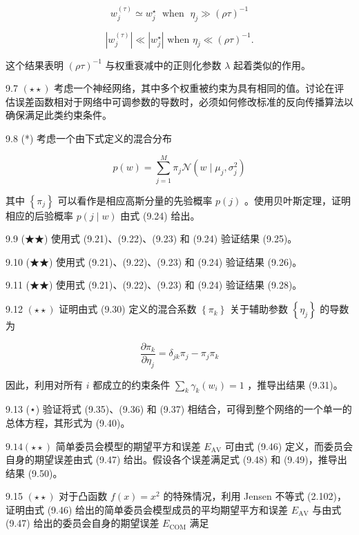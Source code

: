 \documentclass[10pt]{article}
\begin{document}
\[
{w}_{j}^{\left( \tau \right) } \simeq  {w}_{j}^{ \star  }\;\text{ when }\;{\eta }_{j} \gg  {\left( \rho \tau \right) }^{-1} \tag{9.60}
\]

\[
\left| {w}_{j}^{\left( \tau \right) }\right|  \ll  \left| {w}_{j}^{ \star  }\right| \text{ when }{\eta }_{j} \ll  {\left( \rho \tau \right) }^{-1}. \tag{9.61}
\]

这个结果表明 \({\left( \rho \tau \right) }^{-1}\) 与权重衰减中的正则化参数 \(\lambda\) 起着类似的作用。

9.7 \(\left( {\star  \star  }\right)\) 考虑一个神经网络，其中多个权重被约束为具有相同的值。讨论在评估误差函数相对于网络中可调参数的导数时，必须如何修改标准的反向传播算法以确保满足此类约束条件。

9.8 (*) 考虑一个由下式定义的混合分布

\[
p\left( w\right)  = \mathop{\sum }\limits_{{j = 1}}^{M}{\pi }_{j}\mathcal{N}\left( {w \mid  {\mu }_{j},{\sigma }_{j}^{2}}\right)  \tag{9.62}
\]

其中 \(\left\{  {\pi }_{j}\right\}\) 可以看作是相应高斯分量的先验概率 \(p\left( j\right)\) 。使用贝叶斯定理，证明相应的后验概率 \(p\left( {j \mid  w}\right)\) 由式 (9.24) 给出。

9.9 (★★) 使用式 (9.21)、(9.22)、(9.23) 和 (9.24) 验证结果 (9.25)。

9.10 (★★) 使用式 (9.21)、(9.22)、(9.23) 和 (9.24) 验证结果 (9.26)。

9.11 (★★) 使用式 (9.21)、(9.22)、(9.23) 和 (9.24) 验证结果 (9.28)。

9.12 \(\left( {\star  \star  }\right)\) 证明由式 (9.30) 定义的混合系数 \(\left\{  {\pi }_{k}\right\}\) 关于辅助参数 \(\left\{  {\eta }_{j}\right\}\) 的导数为

\[
\frac{\partial {\pi }_{k}}{\partial {\eta }_{j}} = {\delta }_{jk}{\pi }_{j} - {\pi }_{j}{\pi }_{k} \tag{9.63}
\]

因此，利用对所有 \(i\) 都成立的约束条件 \(\mathop{\sum }\limits_{k}{\gamma }_{k}\left( {w}_{i}\right)  = 1\) ，推导出结果 (9.31)。

9.13 (⋆) 验证将式 (9.35)、(9.36) 和 (9.37) 相结合，可得到整个网络的一个单一的总体方程，其形式为 (9.40)。

\({9.14}\left( {\star  \star  }\right)\) 简单委员会模型的期望平方和误差 \({E}_{\mathrm{{AV}}}\) 可由式 (9.46) 定义，而委员会自身的期望误差由式 (9.47) 给出。假设各个误差满足式 (9.48) 和 (9.49)，推导出结果 (9.50)。

9.15 \(\left( {\star  \star  }\right)\) 对于凸函数 \(f\left( x\right)  = {x}^{2}\) 的特殊情况，利用 Jensen 不等式 (2.102)，证明由式 (9.46) 给出的简单委员会模型成员的平均期望平方和误差 \({E}_{\mathrm{{AV}}}\) 与由式 (9.47) 给出的委员会自身的期望误差 \({E}_{\mathrm{{COM}}}\) 满足
\end{document}
